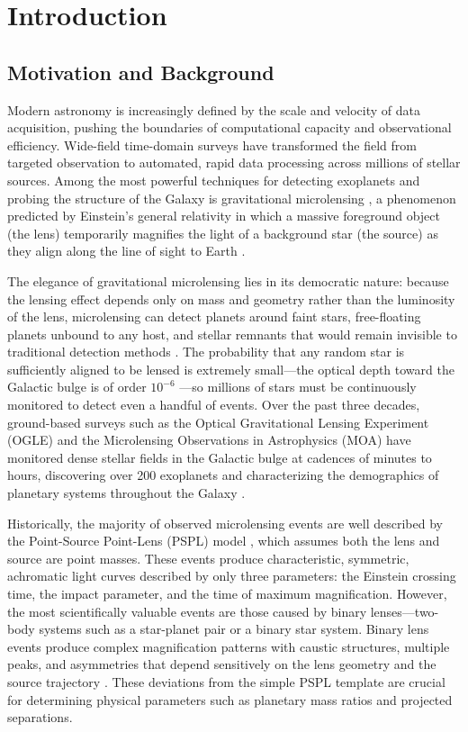 \chapter{Introduction}
\label{ch:introduction}

\section{Motivation and Background}
\label{sec:motivation}

Modern astronomy is increasingly defined by the scale and velocity of data acquisition, pushing the boundaries of computational capacity and observational efficiency. Wide-field time-domain surveys have transformed the field from targeted observation to automated, rapid data processing across millions of stellar sources. Among the most powerful techniques for detecting exoplanets and probing the structure of the Galaxy is gravitational microlensing \citep{Einstein1936,Paczynski1986}, a phenomenon predicted by Einstein's general relativity in which a massive foreground object (the lens) temporarily magnifies the light of a background star (the source) as they align along the line of sight to Earth \citep{Gaudi2012}.

The elegance of gravitational microlensing lies in its democratic nature: because the lensing effect depends only on mass and geometry rather than the luminosity of the lens, microlensing can detect planets around faint stars, free-floating planets unbound to any host, and stellar remnants that would remain invisible to traditional detection methods \citep{Mao1991,Gould1992}. The probability that any random star is sufficiently aligned to be lensed is extremely small---the optical depth toward the Galactic bulge is of order $10^{-6}$ \citep{Mao2012}---so millions of stars must be continuously monitored to detect even a handful of events. Over the past three decades, ground-based surveys such as the Optical Gravitational Lensing Experiment (OGLE) and the Microlensing Observations in Astrophysics (MOA) have monitored dense stellar fields in the Galactic bulge at cadences of minutes to hours, discovering over 200 exoplanets and characterizing the demographics of planetary systems throughout the Galaxy \citep{Udalski2015,Bond2017,Mroz2020}.

Historically, the majority of observed microlensing events are well described by the Point-Source Point-Lens (PSPL) model \citep{Paczynski1986}, which assumes both the lens and source are point masses. These events produce characteristic, symmetric, achromatic light curves described by only three parameters: the Einstein crossing time, the impact parameter, and the time of maximum magnification. However, the most scientifically valuable events are those caused by binary lenses---two-body systems such as a star-planet pair or a binary star system. Binary lens events produce complex magnification patterns with caustic structures, multiple peaks, and asymmetries that depend sensitively on the lens geometry and the source trajectory \citep{Gaudi2012,Dominik1999}. These deviations from the simple PSPL template are crucial for determining physical parameters such as planetary mass ratios and projected separations.

